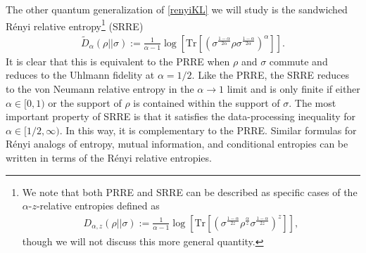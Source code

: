 \documentclass[a4paper,11pt]{article}
\newcommand{\Tr}{\text{Tr}}
\begin{document}
The other quantum generalization of \eqref{renyiKL} we will study is the sandwiched R\'enyi relative entropy\footnote{We note that both PRRE and SRRE can be described as specific cases of the $\alpha$-$z$-relative entropies defined as \cite{2015JMP....56b2202A}
\begin{align}
    D_{\alpha,z}(\rho || \sigma) :=\frac{1}{\alpha - 1}\log \left[\Tr\left[\left(\sigma^{\frac{1-\alpha}{2z}} \rho^{\frac{\alpha}{z}} \sigma^{\frac{1-\alpha}{2z}} \right)^z\right] \right],
\end{align}
though we will not discuss this more general quantity.
} (SRRE) \cite{2013JMP....54l2203M,2014CMaPh.331..593W}
\begin{align}
    \tilde{D}_{\alpha}(\rho || \sigma) := \frac{1}{\alpha - 1}\log\left[ \Tr\left[ \left(\sigma^{\frac{1-\alpha}{2\alpha}}\rho\sigma^{\frac{1-\alpha}{2\alpha}} \right)^{\alpha}\right]\right].
\end{align}
It is clear that this is equivalent to the PRRE when $\rho$ and $\sigma$ commute and reduces to the Uhlmann fidelity at $\alpha = 1/2$. Like the PRRE, the SRRE reduces to the von Neumann relative entropy in the $\alpha \rightarrow 1$ limit and is only finite if either $\alpha \in [0,1)$ or the support of $\rho$ is contained within the support of $\sigma$. The most important property of SRRE is that it satisfies the data-processing inequality for $\alpha \in [1/2, \infty)$. In this way, it is complementary to the PRRE. Similar formulas for R\'enyi analogs of entropy, mutual information, and conditional entropies can be written in terms of the R\'enyi relative entropies.

\end{document}
